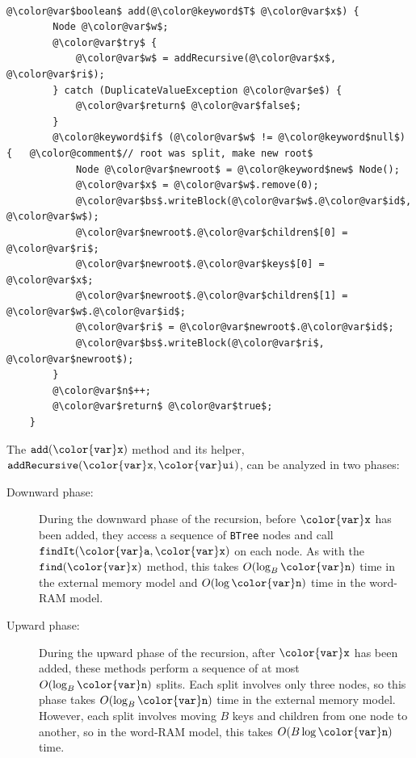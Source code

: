 \documentclass[10pt]{book}
\theoremstyle{plain}
\theoremstyle{definition}
\begin{document}
 \ \vspace{.5ex}\begin{Verbatim}[gobble=1,tabsize=2,frame=single,framerule=1.2pt,commandchars=\\@\$,label=\texttt{BTree},labelposition=topline]
	@\color@var$boolean$ add(@\color@keyword$T$ @\color@var$x$) {
		Node @\color@var$w$;
		@\color@var$try$ {
			@\color@var$w$ = addRecursive(@\color@var$x$, @\color@var$ri$);
		} catch (DuplicateValueException @\color@var$e$) {
			@\color@var$return$ @\color@var$false$;
		}
		@\color@keyword$if$ (@\color@var$w$ != @\color@keyword$null$) {   @\color@comment$// root was split, make new root$
			Node @\color@var$newroot$ = @\color@keyword$new$ Node();
			@\color@var$x$ = @\color@var$w$.remove(0);
			@\color@var$bs$.writeBlock(@\color@var$w$.@\color@var$id$, @\color@var$w$);
			@\color@var$newroot$.@\color@var$children$[0] = @\color@var$ri$;
			@\color@var$newroot$.@\color@var$keys$[0] = @\color@var$x$;
			@\color@var$newroot$.@\color@var$children$[1] = @\color@var$w$.@\color@var$id$;
			@\color@var$ri$ = @\color@var$newroot$.@\color@var$id$;
			@\color@var$bs$.writeBlock(@\color@var$ri$, @\color@var$newroot$);
		}
		@\color@var$n$++;
		@\color@var$return$ @\color@var$true$;
	}
\end{Verbatim}


The \ensuremath{\mathtt{add({\color{var}x})}} method and its helper, \ensuremath{\mathtt{addRecursive({\color{var}x},{\color{var}ui})}}, can be analyzed
in two phases:

\begin{description}
  \item[Downward phase:]
    During the downward phase of the recursion, before \ensuremath{\mathtt{{\color{var}x}}} has been added,
    they access a sequence of \texttt{BTree} nodes and call \ensuremath{\mathtt{findIt({\color{var}a},{\color{var}x})}} on each node.
    As with the \ensuremath{\mathtt{find({\color{var}x})}} method, this takes $O(\log_B \ensuremath{\mathtt{{\color{var}n}}})$ time in the
    external memory model and $O(\log \ensuremath{\mathtt{{\color{var}n}}})$ time in the word-RAM model.
  
  \item[Upward phase:]
    During the upward phase of the recursion, after \ensuremath{\mathtt{{\color{var}x}}} has been added,
    these methods perform a sequence of at most $O(\log_B \ensuremath{\mathtt{{\color{var}n}}})$ splits.
    Each split involves only three nodes, so this phase takes $O(\log_B
    \ensuremath{\mathtt{{\color{var}n}}})$ time in the external memory model.  However, each split
    involves moving $B$ keys and children from one node to another, so
    in the word-RAM model, this takes $O(B\log \ensuremath{\mathtt{{\color{var}n}}})$ time.
\end{description}
\end{document}

